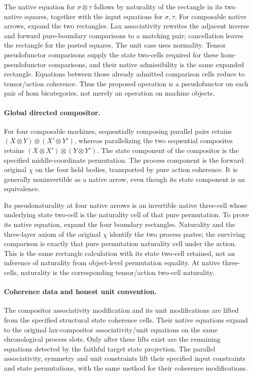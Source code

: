 \documentclass{article}
\begin{document}
The native equation for $\sigma\otimes\tau$ follows by naturality of the rectangle in its two native squares, together with the input equations for $\sigma,\tau$. For composable native arrows, expand the two rectangles. Lax associativity rewrites the adjacent inverse and forward pure-boundary comparisons to a matching pair; cancellation leaves the rectangle for the pasted squares. The unit case uses normality. Tensor pseudofunctor comparisons supply the state two-cells required for these hom-pseudofunctor comparisons, and their native admissibility is the same expanded rectangle. Equations between those already admitted comparison cells reduce to tensor/action coherence. Thus the proposed operation is a pseudofunctor on each pair of hom bicategories, not merely an operation on machine objects.

\paragraph{Global directed compositor.} For four composable machines, sequentially composing parallel pairs retains $(X\otimes Y)\otimes(X'\otimes Y')$, whereas parallelizing the two sequential composites retains $(X\otimes X')\otimes(Y\otimes Y')$. The state component of the compositor is the specified middle-coordinate permutation. The process component is the forward original $\chi$ on the four held bodies, transported by pure action coherence. It is generally noninvertible as a native arrow, even though its state component is an equivalence.

Its pseudonaturality at four native arrows is an invertible native three-cell whose underlying state two-cell is the naturality cell of that pure permutation. To prove its native equation, expand the four boundary rectangles. Naturality and the three-layer axiom of the original $\chi$ identify the two process pastes; the surviving comparison is exactly that pure permutation naturality cell under the action. This is the same rectangle calculation with its state two-cell retained, not an inference of naturality from object-level permutation equality. At native three-cells, naturality is the corresponding tensor/action two-cell naturality.

\paragraph{Coherence data and honest unit convention.} The compositor associativity modification and its unit modifications are lifted from the specified structural state coherence cells. Their native equations expand to the original lax-compositor associativity/unit equations on the same chronological process slots. Only after these lifts exist are the remaining equations detected by the faithful target state projection. The parallel associativity, symmetry and unit constraints lift their specified input constraints and state permutations, with the same method for their coherence modifications.
\end{document}
